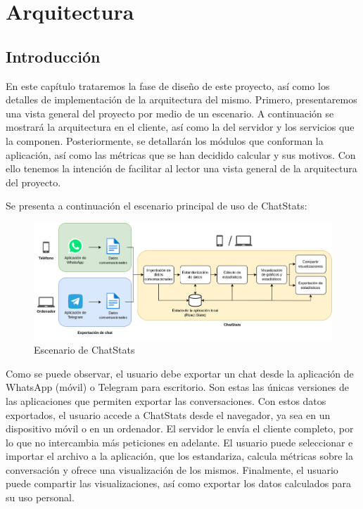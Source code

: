 \chapter{Arquitectura}
\label{chap:architecture}


\section{Introducción}
\label{sec:introduction}

En este capítulo trataremos la fase de diseño de este proyecto, así como los detalles de implementación de la arquitectura del mismo. Primero, presentaremos una vista general del proyecto por medio de un escenario. A continuación se mostrará la arquitectura en el cliente, así como la del servidor y los servicios que la componen. Posteriormente, se detallarán los módulos que conforman la aplicación, así como las métricas que se han decidido calcular y sus motivos. Con ello tenemos la intención de facilitar al lector una vista general de la arquitectura del proyecto.

Se presenta a continuación el escenario principal de uso de ChatStats:

\begin{figure}[H]
	\centering
	\includegraphics[width=\textwidth]{img/scenario.png}
	\caption{Escenario de ChatStats}
	\label{fig:chap4:architecture_scenario}
\end{figure}


Como se puede observar, el usuario debe exportar un chat desde la aplicación de WhatsApp (móvil) o Telegram para escritorio. Son estas las únicas versiones de las aplicaciones que permiten exportar las conversaciones. Con estos datos exportados, el usuario accede a ChatStats desde el navegador, ya sea en un dispositivo móvil o en un ordenador. El servidor le envía el cliente completo, por lo que no intercambia más peticiones en adelante. El usuario puede seleccionar e importar el archivo a la aplicación, que los estandariza, calcula métricas sobre la conversación y ofrece una visualización de los mismos. Finalmente, el usuario puede compartir las visualizaciones, así como exportar los datos calculados para su uso personal.

